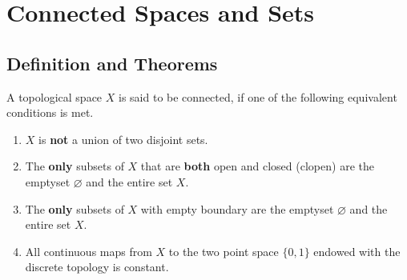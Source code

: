 \chapter{Connected Spaces and Sets}
\section{Definition and Theorems}
\begin{defbox}
    \begin{definition}
        A {\color{mathobj}topological space} \(X\) is said to be {\color{maththen}connected}, if one of the following {\color{mathrem}equivalent} conditions is met.
        \begin{enumerate}
            \item \(X\) is \textbf{not} a {\color{mathif}union} of two {\color{mathif}disjoint} sets.
            \item The \textbf{only} {\color{mathif}subsets} of \(X\) that are \textbf{both} {\color{mathif}open} and {\color{mathif}closed} ({\color{mathrem}clopen}) are the emptyset \(\varnothing\) and the entire set \(X\).
            \item The \textbf{only} {\color{mathif}subsets} of \(X\) with empty {\color{mathif}boundary} are the emptyset \(\varnothing\) and the entire set \(X\).
            \item All {\color{mathif}continuous} maps from \(X\) to the two point space \(\{0, 1\}\) endowed with the {\color{mathif}discrete} topology is {\color{mathif}constant}. 
        \end{enumerate}
    \end{definition}
\end{defbox}

